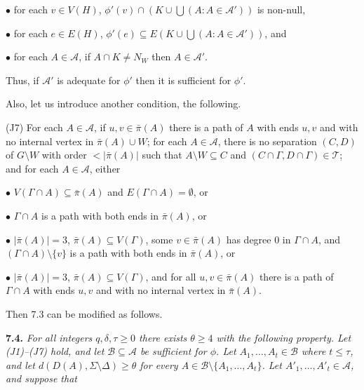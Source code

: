 \hspace*{12pt}$\bullet$ for each $v \in V(H)$, $\phi'(v) \cap (K \cup \bigcup(A \colon A \in \mathcal{A}'))$ is non-null,

\hspace*{12pt}$\bullet$ for each $e \in E(H)$, $\phi'(e) \subseteq E(K \cup \bigcup(A \colon A \in \mathcal{A}'))$, and

\hspace*{12pt}$\bullet$ for each $A \in \mathcal{A}$, if $A \cap K \ne N_W$ then $A \in \mathcal{A}'$.

Thus, if $\mathcal{A}'$ is adequate for $\phi'$ then it is sufficient for $\phi'$.

Also, let us introduce another condition, the following.

\hspace*{12pt}(J7) For each $A \in \mathcal{A}$, if $u, v \in \bar{\pi}(A)$ there is a path of $A$ with ends $u, v$ and with no internal vertex in $\bar{\pi}(A) \cup W$; for each $A \in \mathcal{A}$, there is no separation $(C, D)$ of $G \setminus W$ with order $< |\bar{\pi}(A)|$ such that $A \setminus W \subseteq C$ and $(C \cap \Gamma, D \cap \Gamma) \in \mathcal{T}$; and for each $A \in \mathcal{A}$, either

\hspace*{12pt}$\bullet$ $V(\Gamma \cap A) \subseteq \bar{\pi}(A)$ and $E(\Gamma \cap A) = \emptyset$, or

\hspace*{12pt}$\bullet$ $\Gamma \cap A$ is a path with both ends in $\bar{\pi}(A)$, or

\hspace*{12pt}$\bullet$ $|\bar{\pi}(A)| = 3$, $\bar{\pi}(A) \subseteq V(\Gamma)$, some $v \in \bar{\pi}(A)$ has degree 0 in $\Gamma \cap A$, and $(\Gamma \cap A) \setminus \{v\}$ is a path with both ends in $\bar{\pi}(A)$, or

\hspace*{12pt}$\bullet$ $|\bar{\pi}(A)| = 3$, $\bar{\pi}(A) \subseteq V(\Gamma)$, and for all $u, v \in \bar{\pi}(A)$ there is a path of $\Gamma \cap A$ with ends $u, v$ and with no internal vertex in $\bar{\pi}(A)$.

Then 7.3 can be modified as follows.

\textbf{7.4.} \textit{For all integers $q, \delta, \tau \ge 0$ there exists $\theta \ge 4$ with the following property. Let (J1)--(J7) hold, and let $\mathcal{B} \subseteq \mathcal{A}$ be sufficient for $\phi$. Let $A_1, \ldots, A_t \in \mathcal{B}$ where $t \le \tau$, and let $d(D(A), \Sigma \setminus \Delta) \ge \theta$ for every $A \in \mathcal{B} \setminus \{A_1, \ldots, A_t\}$. Let $A'_1, \ldots, A'_t \in \mathcal{A}$, and suppose that}
